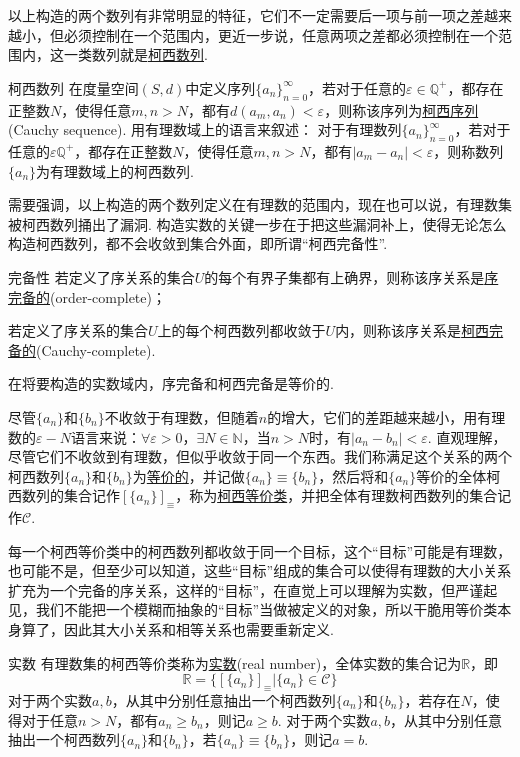 \documentclass[main.tex]{subfiles}
\begin{document}
以上构造的两个数列有非常明显的特征，它们不一定需要后一项与前一项之差越来越小，但必须控制在一个范围内，更近一步说，任意两项之差都必须控制在一个范围内，这一类数列就是\uline{柯西数列}.
\begin{definition}{柯西数列}
    在度量空间\((S,d)\)中定义序列\(\{a_n\}_{n=0}^{\infty}\)，若对于任意的\(\varepsilon \in \mathbb{Q}^+\)，都存在正整数\(N\)，使得任意\(m,n>N\)，都有\(d(a_{m},a_{n}) < \varepsilon\)，则称该序列为\uline{柯西序列}(Cauchy sequence).
    用有理数域上的语言来叙述：
        对于有理数列\(\{a_n\}_{n=0}^{\infty}\)，若对于任意的\(\varepsilon \mathbb{Q}^+\)，都存在正整数\(N\)，使得任意\(m,n>N\)，都有\(|a_{m}-a_{n}| < \varepsilon\)，则称数列\(\{a_n\}\)为有理数域上的柯西数列.
\end{definition}
需要强调，以上构造的两个数列定义在有理数的范围内，现在也可以说，有理数集被柯西数列捅出了漏洞. 构造实数的关键一步在于把这些漏洞补上，使得无论怎么构造柯西数列，都不会收敛到集合外面，即所谓“柯西完备性”.

\begin{definition}{完备性}
    若定义了序关系的集合\(U\)的每个有界子集都有上确界，则称该序关系是\uline{序完备的}(order-complete)；
    \par
    若定义了序关系的集合\(U\)上的每个柯西数列都收敛于\(U\)内，则称该序关系是\uline{柯西完备的}(Cauchy-complete).
\end{definition}

在将要构造的实数域内，序完备和柯西完备是等价的.

尽管\(\{a_n\}\)和\(\{b_n\}\)不收敛于有理数，但随着\(n\)的增大，它们的差距越来越小，用有理数的\(\varepsilon-N\)语言来说：\(\forall \varepsilon > 0\)，\(\exists N\in \mathbb{N}\)，当\(n > N\)时，有\(|a_n-b_n|<\varepsilon\). 直观理解，尽管它们不收敛到有理数，但似乎收敛于同一个东西。我们称满足这个关系的两个柯西数列\(\{a_n\}\)和\(\{b_n\}\)为\uline{等价的}，并记做\(\{a_n\} \equiv \{b_n\}\)，然后将和\(\{a_n\}\)等价的全体柯西数列的集合记作\([\{a_n\}]_{\equiv}\)，称为\uline{柯西等价类}，并把全体有理数柯西数列的集合记作\(\mathcal{C}\).

每一个柯西等价类中的柯西数列都收敛于同一个目标，这个“目标”可能是有理数，也可能不是，但至少可以知道，这些“目标”组成的集合可以使得有理数的大小关系扩充为一个完备的序关系，这样的“目标”，在直觉上可以理解为实数，但严谨起见，我们不能把一个模糊而抽象的“目标”当做被定义的对象，所以干脆用等价类本身算了，因此其大小关系和相等关系也需要重新定义.
\begin{definition}{实数}
    有理数集的柯西等价类称为\uline{实数}(real number)，全体实数的集合记为\(\mathbb{R}\)，即
    \[\mathbb{R} = \{[\{a_n\}]_{\equiv} | \{a_n\}\in \mathcal{C}\}\]
    \newline
    对于两个实数\(a,b\)，从其中分别任意抽出一个柯西数列\(\{a_n\}\)和\(\{b_n\}\)，若存在\(N\)，使得对于任意\(n>N\)，都有\(a_n \geq b_n\)，则记\(a \geq b\).
    \newline
    对于两个实数\(a,b\)，从其中分别任意抽出一个柯西数列\(\{a_n\}\)和\(\{b_n\}\)，若\(\{a_n\} \equiv \{b_n\}\)，则记\(a=b\).
\end{definition}
\end{document}
